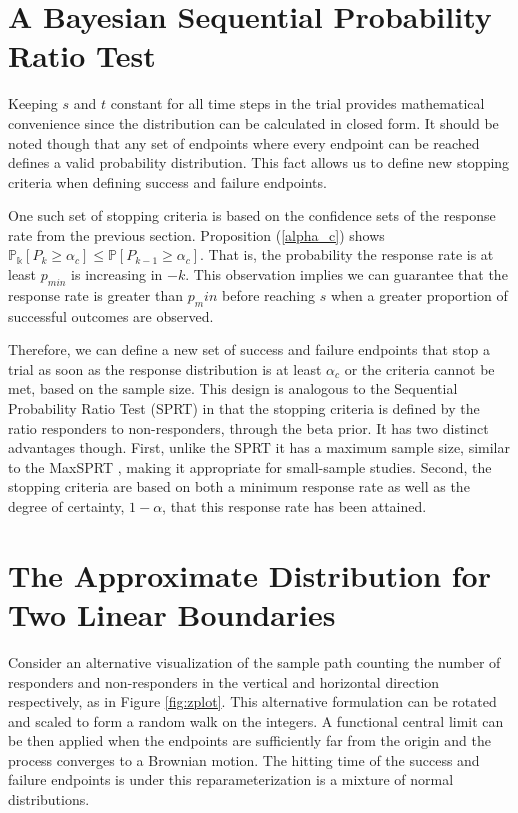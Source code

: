 \documentclass[12pt]{article}
\begin{document}
\section{A Bayesian Sequential Probability Ratio Test}

Keeping $s$ and $t$ constant for all time steps in the trial provides 
mathematical convenience since the distribution can be calculated in closed 
form. It should be noted though that any set of endpoints where every endpoint 
can be reached defines a valid probability distribution. This fact allows us 
to define new stopping criteria when defining success and failure endpoints.

One such set of stopping criteria is based on the confidence sets of the 
response rate from the previous section. Proposition (\ref{alpha_c}) shows 
$\mathbb{P_k} [P_k \geq \alpha_c] \leq \mathbb{P}[P_{k-1} \geq \alpha_c]$. 
That is, the probability the response rate is at least $p_{min}$ is increasing 
in $-k$. This observation implies we can guarantee that the response rate is 
greater than $p_min$ before reaching $s$ when a greater proportion of 
successful outcomes are observed.

Therefore, we can define a new set of success and failure endpoints that stop 
a trial as soon as the response distribution is at least $\alpha_c$ or the 
criteria cannot be met, based on the sample size. This design is analogous to 
the Sequential Probability Ratio Test (SPRT) \cite{Wald1945} in that the 
stopping criteria is defined by the ratio responders to non-responders, 
through the beta prior. It has two distinct advantages though. First, unlike 
the SPRT it has a maximum sample size, similar to the MaxSPRT 
\cite{Kulldorff2011}, making it appropriate for small-sample studies. Second, 
the stopping criteria are based on both a minimum response rate as well as the 
degree of certainty, $1-\alpha$, that this response rate has been attained.




\section{The Approximate Distribution for Two Linear Boundaries}

Consider an alternative visualization of the sample path counting the 
number of responders and non-responders in the vertical and horizontal 
direction respectively, as in Figure \ref{fig:zplot}. This alternative
formulation can be rotated and scaled to form a random walk on the integers.
A functional central limit can be then applied when the endpoints are 
sufficiently far from the origin and the process converges to a Brownian 
motion. The hitting time of the success and failure endpoints is under 
this reparameterization is a mixture of normal distributions.
\end{document}
